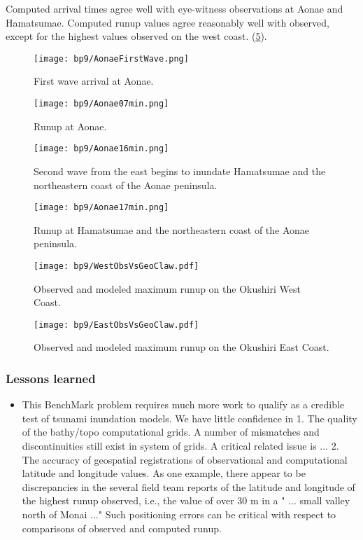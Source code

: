  Computed arrival times agree well with eye-witness observations at Aonae and Hamatsumae.  Computed runup values agree reasonably well with observed, except for the highest values observed on the west coast. (\ref{WestObsVsGeoClaw}).  

\begin{figure}[ht]
\hfil\texttt{[image: bp9/AonaeFirstWave.png]}\hfil
\caption{\label{AonaeFirstWave}
First wave arrival at Aonae.
  }
\end{figure} 

\begin{figure}[ht]
\hfil\texttt{[image: bp9/Aonae07min.png]}\hfil
\caption{\label{Aonae07min}
Runup at Aonae.
  }
\end{figure}

\begin{figure}[ht]
\hfil\texttt{[image: bp9/Aonae16min.png]}\hfil
\caption{\label{Aonae16min}
Second wave from the east begins to inundate Hamatsumae and the northeastern coast of the Aonae peninsula.
  }
\end{figure} 

\begin{figure}[ht]
\hfil\texttt{[image: bp9/Aonae17min.png]}\hfil
\caption{\label{Aonae17min}
Runup at Hamatsumae and the northeastern coast of the Aonae peninsula.
  }
\end{figure} 

\begin{figure}[ht]
\hfil\texttt{[image: bp9/WestObsVsGeoClaw.pdf]}\hfil
\caption{\label{WestObsVsGeoClaw}
Observed and modeled maximum runup on the Okushiri West Coast.
  }
\end{figure} 

\begin{figure}[ht]
\hfil\texttt{[image: bp9/EastObsVsGeoClaw.pdf]}\hfil
\caption{\label{EastObsVsGeoClaw}
Observed and modeled maximum runup on the Okushiri East Coast.
  }
\end{figure} 
   
\subsubsection{Lessons learned}
\begin{itemize}
\item This BenchMark problem requires much more work to qualify as a credible test of tsunami inundation models.  We have little confidence in 
   1. The quality of the bathy/topo computational grids.  A number of mismatches and discontinuities still exist in system of grids.  A critical related issue is ... 
   2. The accuracy of geospatial registrations of observational and computational latitude and longitude values.  As one example, there appear to be discrepancies in the several field team reports of the latitude and longitude of the highest runup observed, i.e., the value of over 30 m in a " ... small valley north of Monai ..."  Such positioning errors can be critical with respect to comparisons of observed and computed runup.
\end{itemize}

